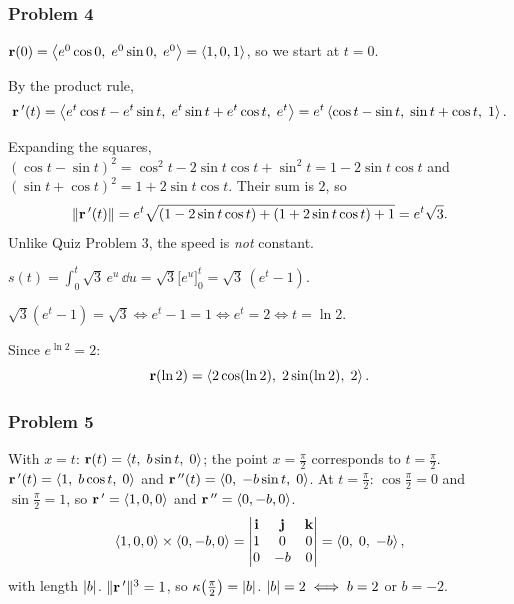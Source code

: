 \subsubsection*{Problem 4}

 $\mathbf{r}(0)=\left\langle e^0\cos0,\;e^0\sin0,\;e^0 \right\rangle=\left\langle 1,0,1 \right\rangle$, so we start at $t=0$.

 By the product rule,
\[
  \mathbf{r}\,'(t)=\left\langle e^t\cos t-e^t\sin t,\;e^t\sin t+e^t\cos t,\;e^t \right\rangle=e^t\left\langle \cos t-\sin t,\;\sin t+\cos t,\;1 \right\rangle.
\]

 Expanding the squares,
$(\cos t-\sin t)^2=\cos^2t-2\sin t\cos t+\sin^2t=1-2\sin t\cos t$ and
$(\sin t+\cos t)^2=1+2\sin t\cos t$. Their sum is $2$, so
\[
  \lVert\mathbf{r}\,'(t)\rVert=e^t\sqrt{(1-2\sin t\cos t)+(1+2\sin t\cos t)+1}=e^t\sqrt3 .
\]
Unlike Quiz Problem 3, the speed is \emph{not} constant.

$s(t)=\displaystyle\int_0^t\sqrt3\,e^u\,\dd u=\sqrt3\Big[e^u\Big]_0^t=\sqrt3\,(e^t-1)$.

 $\sqrt3(e^t-1)=\sqrt3\iff e^t-1=1\iff e^t=2\iff t=\ln2$.

 Since $e^{\ln2}=2$:
\[
  \mathbf{r}(\ln2)=\left\langle 2\cos(\ln2),\;2\sin(\ln2),\;2 \right\rangle.
\]

\subsubsection*{Problem 5}

 With $x=t$: $\mathbf{r}(t)=\left\langle t,\;b\sin t,\;0 \right\rangle$; the point
$x=\frac\pi2$ corresponds to $t=\frac\pi2$.
 $\mathbf{r}\,'(t)=\left\langle 1,\;b\cos t,\;0 \right\rangle$ and $\mathbf{r}\,''(t)=\left\langle 0,\;-b\sin t,\;0 \right\rangle$.
At $t=\frac\pi2$: $\cos\frac\pi2=0$ and $\sin\frac\pi2=1$, so
$\mathbf{r}\,'=\left\langle 1,0,0 \right\rangle$ and $\mathbf{r}\,''=\left\langle 0,-b,0 \right\rangle$.
\[
  \left\langle 1,0,0 \right\rangle\times\left\langle 0,-b,0 \right\rangle=\begin{vmatrix}\mathbf{i}&\mathbf{j}&\mathbf{k}\\1&0&0\\0&-b&0\end{vmatrix}=\left\langle 0,\;0,\;-b \right\rangle,
\]
with length $\lvert b\rvert$.
 $\lVert\mathbf{r}\,'\rVert^3=1$, so $\kappa\!\left(\frac\pi2\right)=\lvert b\rvert$.
 $\lvert b\rvert=2\iff b=2$ or $b=-2$.

